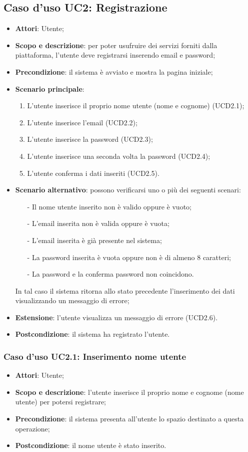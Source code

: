 \newpage
\subsection{Caso d'uso UC2: Registrazione}
\begin{itemize}
\item \textbf{Attori}: Utente;
\item \textbf{Scopo e descrizione}: per poter usufruire dei servizi forniti dalla piattaforma, l'utente deve registrarsi inserendo email e password;
\item \textbf{Precondizione}: il sistema è avviato e mostra la pagina iniziale;
\item \textbf{Scenario principale}:
	\begin{enumerate}
	\item L'utente inserisce il proprio nome utente (nome e cognome) (UCD2.1);
	\item L'utente inserisce l'email (UCD2.2);
	\item L'utente inserisce la password (UCD2.3);
	\item L'utente inserisce una seconda volta la password (UCD2.4);
	\item L'utente conferma i dati inseriti (UCD2.5).
	\end{enumerate}
\item \textbf{Scenario alternativo}: possono verificarsi uno o più dei seguenti scenari:
	\begin{itemize}
	\item[-] Il nome utente inserito non è valido oppure è vuoto;
	\item[-] L'email inserita non è valida oppure è vuota;
	\item[-] L'email inserita è già presente nel sistema;
	\item[-] La password inserita è vuota oppure non è di almeno 8 caratteri;
	\item[-] La password e la conferma password non coincidono.
	\end{itemize}
In tal caso il sistema ritorna allo stato precedente l'inserimento dei dati visualizzando un messaggio di errore;
\item \textbf{Estensione}: l'utente visualizza un messaggio di errore (UCD2.6).
\item \textbf{Postcondizione}: il sistema ha registrato l'utente.
\end{itemize}

\subsubsection{Caso d'uso UC2.1: Inserimento nome utente}
\begin{itemize}
\item \textbf{Attori}: Utente;
\item \textbf{Scopo e descrizione}: l'utente inserisce il proprio nome e cognome (nome utente) per potersi registrare;
\item \textbf{Precondizione}: il sistema presenta all'utente lo spazio destinato a questa operazione;
\item \textbf{Postcondizione}: il nome utente è stato inserito.
\end{itemize}

